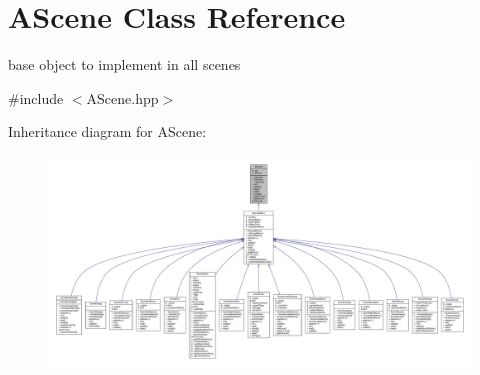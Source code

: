 \hypertarget{class_a_scene}{}\section{A\+Scene Class Reference}
\label{class_a_scene}


base object to implement in all scenes  




{\ttfamily \#include $<$A\+Scene.\+hpp$>$}



Inheritance diagram for A\+Scene\+:
\nopagebreak
\begin{figure}[H]
\begin{center}
\leavevmode
\includegraphics[width=350pt]{class_a_scene__inherit__graph}
\end{center}
\end{figure}


